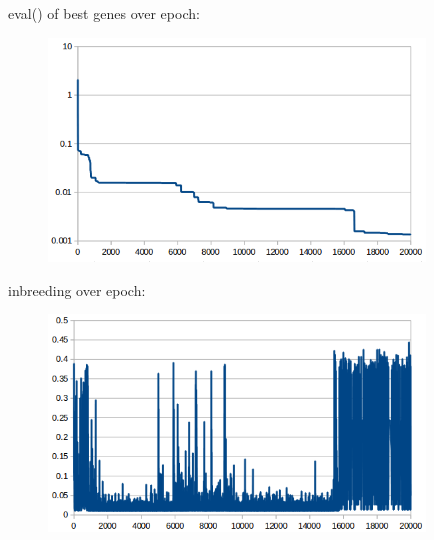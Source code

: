 eval() of best genes over epoch:\\
\begin{center}
\begin{figure}[H]
\centering\includegraphics[width=10cm]{./eval.png}\\
\end{figure}
\end{center}

inbreeding over epoch:\\
\begin{center}
\begin{figure}[H]
\centering\includegraphics[width=10cm]{./inbreeding.png}\\
\end{figure}
\end{center}
